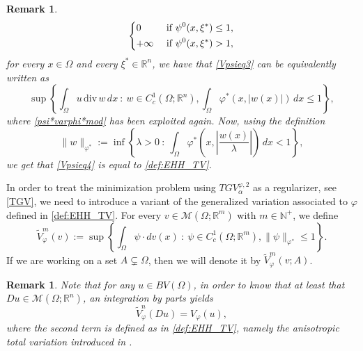 \documentclass[a4paper,11pt,oneside,notitlepage]{article}
\newtheorem{remark}[theorem]{Remark}
\numberwithin{equation}{section}
\def\R{\mathbb{R}}
\def\N{\mathbb{N}}
\def\M{\mathcal{M}}
\renewcommand{\div}{\mathrm{div}}
\newcommand{\vphi}{\varphi}
\newcommand{\st}{ \ : \ }
\begin{document}
\begin{remark}
\begin{equation*}
\begin{dcases}
            0 & \textnormal{ if } \psi^0(x, \xi^*) \le 1, \\
            +\infty & \textnormal{ if } \psi^0(x, \xi^*) > 1,
        \end{dcases}
    \end{equation*}
    for every $x \in \Omega$ and every $\xi^* \in \R^n$, we have that \eqref{Vpsieq3} can be equivalently written as
    \begin{equation}
    \label{Vpsieq4}
        \sup \left\{\int_\Omega u \, \div \, w \, dx \st w \in C^1_c(\Omega;\R^n), \int_\Omega \vphi^*(x, |w(x)|) \, dx \le 1 \right\},
    \end{equation}
    where \eqref{psi*varphi*mod} has been exploited again. Now, using the definition
    \begin{equation*}
        \|w\|_{\vphi^*} := \inf \left\{\lambda > 0 \st \int_\Omega \vphi^* \left(x, \left|\frac{w(x)}{\lambda} \right| \right) \, dx < 1 \right\},
    \end{equation*}
    we get that \eqref{Vpsieq4} is equal to \eqref{def:EHH_TV}.
\end{remark}

In order to treat the minimization problem using $TGV^{\vphi,2}_\alpha$ as a regularizer, see \eqref{TGV}, we need to introduce a variant of the generalized variation associated to $\vphi$ defined in \eqref{def:EHH_TV}. For every $v \in \M(\Omega;\R^m)$ with $m \in \N^+$, we define
\begin{equation}
\label{V_tilde}
    \widetilde{V}^m_\vphi(v) := \sup \left\{\int_\Omega \psi \cdot dv(x) \st \psi \in C^1_c(\Omega;\R^m), \|\psi\|_{\vphi^*} \le 1 \right\}.
\end{equation}
If we are working on a set $A \subsetneq \Omega$, then we will denote it by $\widetilde{V}^m_\vphi(v;A)$.

\begin{remark}
\label{rk:v-equiv}
    Note that for any $u \in BV(\Omega)$, in order to know that at least that $Du \in \M(\Omega;\R^n)$, an integration by parts yields
    \begin{equation*}
        \widetilde{V}^n_\vphi(Du) = V_\vphi(u),
    \end{equation*}
    where the second term is defined as in \eqref{def:EHH_TV}, namely the anisotropic total variation introduced in \cite{EHH}.
\end{remark}
\end{document}
